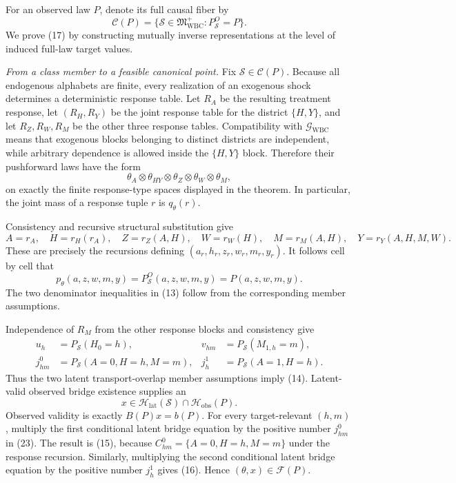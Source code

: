 For an observed law \(P\), denote its full causal fiber by
\[
 \mathcal C(P)=\{\mathcal S\in\mathfrak M_{\mathrm{WBC}}^{+}:
 P_{\mathcal S}^O=P\}.
\]
We prove (17) by constructing mutually inverse representations at the level
of induced full-law target values.

\emph{From a class member to a feasible canonical point.}
Fix \(\mathcal S\in\mathcal C(P)\).  Because all endogenous alphabets are
finite, every realization of an exogenous shock determines a deterministic
response table.  Let \(R_A\) be the resulting treatment response, let
\((R_H,R_Y)\) be the joint response table for the district \(\{H,Y\}\),
and let \(R_Z,R_W,R_M\) be the other three response tables.  Compatibility
with \(\mathcal G_{\mathrm{WBC}}\) means that exogenous blocks belonging to
distinct districts are independent, while arbitrary dependence is allowed
inside the \(\{H,Y\}\) block.  Therefore their pushforward laws have the
form
\[
 \theta_A\otimes\theta_{HY}\otimes\theta_Z\otimes\theta_W
 \otimes\theta_M,
\]
on exactly the finite response-type spaces displayed in the theorem.  In
particular, the joint mass of a response tuple \(r\) is \(q_\theta(r)\).

Consistency and recursive structural substitution give
\[
 A=r_A,\quad H=r_H(r_A),\quad Z=r_Z(A,H),\quad W=r_W(H),\quad
 M=r_M(A,H),\quad Y=r_Y(A,H,M,W).
\]
These are precisely the recursions defining
\((a_r,h_r,z_r,w_r,m_r,y_r)\).  It follows cell by cell that
\[
 p_\theta(a,z,w,m,y)=P_{\mathcal S}^O(a,z,w,m,y)=P(a,z,w,m,y).
 \tag{22}
\]
The two denominator inequalities in (13) follow from the corresponding
member assumptions.

Independence of \(R_M\) from the other response blocks and consistency give
\[
\begin{aligned}
 u_h&=P_{\mathcal S}(H_0=h),&
 v_{hm}&=P_{\mathcal S}(M_{1,h}=m),\\
 j^0_{hm}&=P_{\mathcal S}(A=0,H=h,M=m),&
 j^1_h&=P_{\mathcal S}(A=1,H=h).
\end{aligned}
 \tag{23}
\]
Thus the two latent transport-overlap member assumptions imply (14).
Latent-valid observed bridge existence supplies an
\[
 x\in\mathcal H_{\mathrm{lat}}(\mathcal S)
      \cap\mathcal H_{\mathrm{obs}}(P).
\]
Observed validity is exactly \(B(P)x=b(P)\).  For every target-relevant
\((h,m)\), multiply the first conditional latent bridge equation by the
positive number \(j^0_{hm}\) in (23).  The result is (15), because
\(C^0_{hm}=\{A=0,H=h,M=m\}\) under the response recursion.  Similarly,
multiplying the second conditional latent bridge equation by the positive
number \(j^1_h\) gives (16).  Hence \((\theta,x)\in\mathcal F(P)\).

